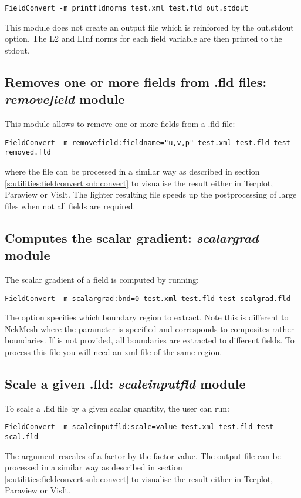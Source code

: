 \begin{lstlisting}[style=BashInputStyle]
FieldConvert -m printfldnorms test.xml test.fld out.stdout
\end{lstlisting}

This module does not create an output file which is reinforced by the
out.stdout option. The L2 and LInf norms for each field variable are
then printed to the stdout.
%
%
%

\subsection{Removes one or more fields from .fld files: \textit{removefield} module}
This module allows to remove one or more fields from a .fld file:
\begin{lstlisting}[style=BashInputStyle]
FieldConvert -m removefield:fieldname="u,v,p" test.xml test.fld test-removed.fld
\end{lstlisting}
where the file  can be processed in a similar
way as described in section \ref{s:utilities:fieldconvert:sub:convert}
to visualise the result either in Tecplot, Paraview or VisIt. The lighter resulting
file speeds up the postprocessing of large files when not all fields are required. 
%
%
%

\subsection{Computes the scalar gradient: \textit{scalargrad} module}
The scalar gradient of a field is computed by running:
\begin{lstlisting}[style=BashInputStyle]
FieldConvert -m scalargrad:bnd=0 test.xml test.fld test-scalgrad.fld
\end{lstlisting}
The option  specifies which boundary region to extract. Note this is different to NekMesh where the parameter  is specified and corresponds to composites rather boundaries. If  is not provided, all boundaries are extracted to different fields. To process this file you will need an xml file of the same region.

%
%
%

\subsection{Scale a given .fld: \textit{scaleinputfld} module}
To scale a .fld file by a given scalar quantity, the user can run:
\begin{lstlisting}[style=BashInputStyle]
FieldConvert -m scaleinputfld:scale=value test.xml test.fld test-scal.fld
\end{lstlisting}
The argument  rescales of a factor 
 by the factor value.
The output file  can be processed in a similar
way as described in section \ref{s:utilities:fieldconvert:sub:convert}
to visualise the result  either in Tecplot, Paraview or VisIt.


